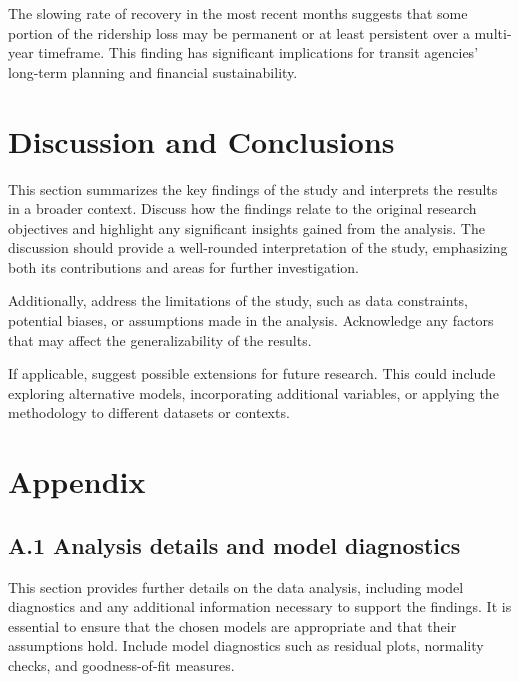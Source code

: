\documentclass[11pt]{article}
\begin{document}
The slowing rate of recovery in the most recent months suggests that some portion of the ridership loss may be permanent or at least persistent over a multi-year timeframe. This finding has significant implications for transit agencies' long-term planning and financial sustainability.

\section{Discussion and Conclusions}

This section summarizes the key findings of the study and interprets the results in a broader context. Discuss how the findings relate to the original research objectives and highlight any significant insights gained from the analysis. The discussion should provide a well-rounded interpretation of the study, emphasizing both its contributions and areas for further investigation.

Additionally, address the limitations of the study, such as data constraints, potential biases, or assumptions made in the analysis. Acknowledge any factors that may affect the generalizability of the results.

If applicable, suggest possible extensions for future research. This could include exploring alternative models, incorporating additional variables, or applying the methodology to different datasets or contexts.

\appendix
\section*{Appendix}

\subsection*{A.1 Analysis details and model diagnostics}

This section provides further details on the data analysis, including model diagnostics and any additional information necessary to support the findings. It is essential to ensure that the chosen models are appropriate and that their assumptions hold. Include model diagnostics such as residual plots, normality checks, and goodness-of-fit measures.
\end{document}
